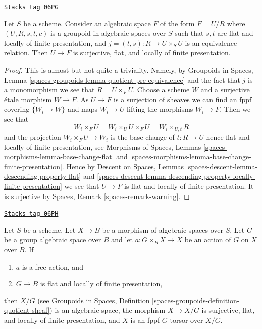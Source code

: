 \begin{lemma}
\label{bootstrap-lemma-covering-quotient}
\href{https://stacks.math.columbia.edu/tag/06PG}{\texttt{Stacks tag 06PG}}

Let $S$ be a scheme. Consider an algebraic space $F$ of the form $F = U/R$
where $(U, R, s, t, c)$ is a groupoid in algebraic spaces
over $S$ such that $s, t$ are flat and locally of finite presentation, and
$j = (t, s) : R \to U \times_S U$ is an equivalence relation.
Then $U \to F$ is surjective, flat, and locally of finite presentation.
\end{lemma}

\begin{proof}
This is almost but not quite a triviality. Namely, by
Groupoids in Spaces, Lemma
\ref{spaces-groupoids-lemma-quotient-pre-equivalence}
and the fact that $j$ is a monomorphism we see that $R = U \times_F U$.
Choose a scheme $W$ and a surjective \'etale morphism $W \to F$.
As $U \to F$ is a surjection of sheaves we can find an fppf covering
$\{W_i \to W\}$ and maps $W_i \to U$ lifting the morphisms $W_i \to F$.
Then we see that
$$
W_i \times_F U = W_i \times_U U \times_F U = W_i \times_{U, t} R
$$
and the projection $W_i \times_F U \to W_i$ is the base change of
$t : R \to U$ hence flat and locally of finite presentation, see
Morphisms of Spaces, Lemmas
\ref{spaces-morphisms-lemma-base-change-flat} and
\ref{spaces-morphisms-lemma-base-change-finite-presentation}.
Hence by
Descent on Spaces, Lemmas
\ref{spaces-descent-lemma-descending-property-flat} and
\ref{spaces-descent-lemma-descending-property-locally-finite-presentation}
we see that $U \to F$ is flat and locally of finite presentation.
It is surjective by
Spaces, Remark \ref{spaces-remark-warning}.
\end{proof}

\begin{lemma}
\label{bootstrap-lemma-quotient-free-action}
\href{https://stacks.math.columbia.edu/tag/06PH}{\texttt{Stacks tag 06PH}}

Let $S$ be a scheme. Let $X \to B$ be a morphism of algebraic spaces over
$S$. Let $G$ be a group algebraic space over $B$ and let
$a : G \times_B X \to X$ be an action of $G$ on $X$ over $B$.
If
\begin{enumerate}
\item $a$ is a free action, and
\item $G \to B$ is flat and locally of finite presentation,
\end{enumerate}
then $X/G$ (see
Groupoids in Spaces, Definition
\ref{spaces-groupoids-definition-quotient-sheaf})
is an algebraic space, the morphism $X \to X/G$ is
surjective, flat, and locally of finite presentation, and
$X$ is an fppf $G$-torsor over $X/G$.
\end{lemma}

